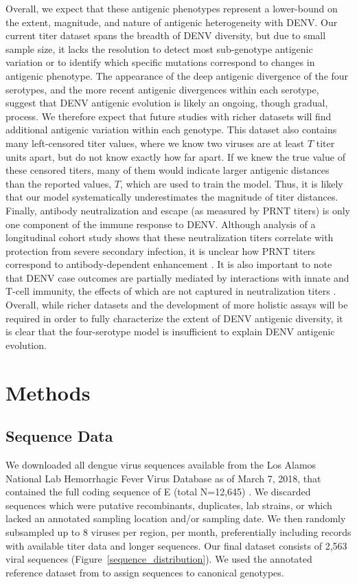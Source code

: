 Overall, we expect that these antigenic phenotypes represent a lower-bound on the extent, magnitude, and nature of antigenic heterogeneity with DENV.
Our current titer dataset spans the breadth of DENV diversity, but due to small sample size, it lacks the resolution to detect most sub-genotype antigenic variation or to identify which specific mutations correspond to changes in antigenic phenotype.
The appearance of the deep antigenic divergence of the four serotypes, and the more recent antigenic divergences within each serotype, suggest that DENV antigenic evolution is likely an ongoing, though gradual, process.
We therefore expect that future studies with richer datasets will find additional antigenic variation within each genotype.
This dataset also contains many left-censored titer values, where we know two viruses are at least $T$ titer units apart, but do not know exactly how far apart.
If we knew the true value of these censored titers, many of them would indicate larger antigenic distances than the reported values, $T$, which are used to train the model.
Thus, it is likely that our model systematically underestimates the magnitude of titer distances.
Finally, antibody neutralization and escape (as measured by PRNT titers) is only one component of the immune response to DENV.
Although analysis of a longitudinal cohort study shows that these neutralization titers correlate with protection from severe secondary infection, it is unclear how PRNT titers correspond to antibody-dependent enhancement \citep{katzelnick2016neutralizing}.
It is also important to note that DENV case outcomes are partially mediated by interactions with innate and T-cell immunity, the effects of which are not captured in neutralization titers \citep{green2014innate}.
Overall, while richer datasets and the development of more holistic assays will be required in order to fully characterize the extent of DENV antigenic diversity, it is clear that the four-serotype model is insufficient to explain DENV antigenic evolution.

\section{Methods}
\subsection*{Sequence Data}
We downloaded all dengue virus sequences available from the Los Alamos National Lab Hemorrhagic Fever Virus Database as of March 7, 2018, that contained the full coding sequence of E (total N=12,645) \citep{kuiken2011lanl}.
We discarded sequences which were putative recombinants, duplicates, lab strains, or which lacked an annotated sampling location and/or sampling date.
We then randomly subsampled up to 8 viruses per region, per month, preferentially including records with available titer data and longer sequences.
Our final dataset consists of 2,563 viral sequences (Figure~\ref{sequence_distribution}).
We used the annotated reference dataset from \citep{pyke2016highly} to assign sequences to canonical genotypes.

